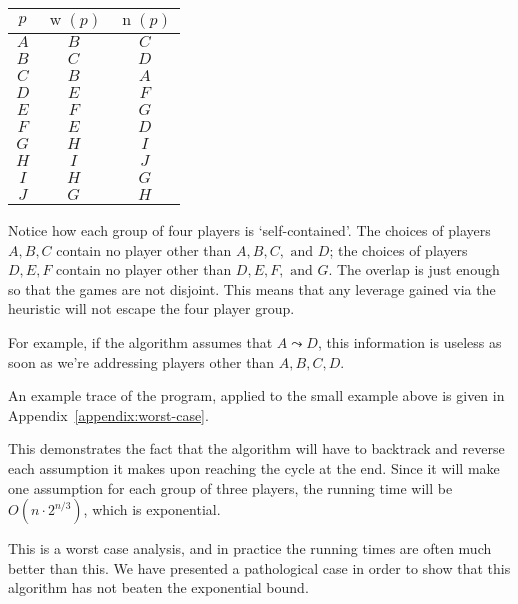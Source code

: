 \documentclass[12pt,x11names, rgb]{article}
\DeclareMathOperator{\w}{w}
\DeclareMathOperator{\n}{n}
\begin{document}
    \begin{center}
        \begin{tabular}{c | c | c}
            $p$ & $\w(p)$ & $\n(p)$\\
            \hline
            $A$ & $B$ & $C$\\
            $B$ & $C$ & $D$\\
            $C$ & $B$ & $A$\\
            \hline
            $D$ & $E$ & $F$\\
            $E$ & $F$ & $G$\\
            $F$ & $E$ & $D$\\
            \hline
            $G$ & $H$ & $I$\\
            $H$ & $I$ & $J$\\
            $I$ & $H$ & $G$\\
            $J$ & $G$ & $H$
        \end{tabular}
    \end{center}

    Notice how each group of four players is `self-contained'. The choices of players $A,B,C$ contain no player other than $A,B,C, \text{ and } D$; the choices of players $D, E, F$ contain no player other than $D, E, F, \text{ and } G$. The overlap is just enough so that the games are not disjoint. This means that any leverage gained via the heuristic will not escape the four player group.

    For example, if the algorithm assumes that $A \leadsto D$, this information is useless as soon as we're addressing players other than $A,B,C,D$.

    An example trace of the program, applied to the small example above is given in Appendix~\ref{appendix:worst-case}.

    This demonstrates the fact that the algorithm will have to backtrack and reverse each assumption it makes upon reaching the cycle at the end. Since it will make one assumption for each group of three players, the running time will be $O(n \cdot 2^{n/3})$, which is exponential. 

    This is a worst case analysis, and in practice the running times are often much better than this. We have presented a pathological case in order to show that this algorithm has not beaten the exponential bound.

\begin{comment}
\section{Overview: Steiner Triple Systems}
    Definition, examples
    discuss how the number of pairs dominates the number of players
    (this defeats our heuristic)
    A slightly better algorithm could `outsmart' our trap from the previous section, but the existence of Steiner Triple Systems shows that we can have so few repeated pairs as to render the heuristic useless. STS shows that this is a systemic problem. 
\end{comment}
\end{document}
